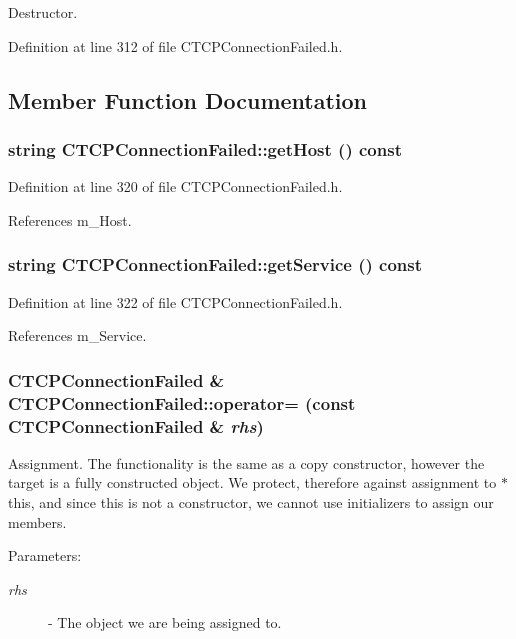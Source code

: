 Destructor.



Definition at line 312 of file CTCPConnection\-Failed.h.

\subsection{Member Function Documentation}
\subsubsection{\setlength{\rightskip}{0pt plus 5cm}string CTCPConnection\-Failed::get\-Host () const\hspace{0.3cm}{\tt  [inline]}}\label{classCTCPConnectionFailed_a5}




Definition at line 320 of file CTCPConnection\-Failed.h.

References m\_\-Host.
\subsubsection{\setlength{\rightskip}{0pt plus 5cm}string CTCPConnection\-Failed::get\-Service () const\hspace{0.3cm}{\tt  [inline]}}\label{classCTCPConnectionFailed_a6}




Definition at line 322 of file CTCPConnection\-Failed.h.

References m\_\-Service.
\subsubsection{\setlength{\rightskip}{0pt plus 5cm}CTCPConnection\-Failed \& CTCPConnection\-Failed::operator= (const CTCPConnection\-Failed \& {\em rhs})}\label{classCTCPConnectionFailed_a3}


Assignment. The functionality is the same as a copy constructor, however the target is a fully constructed object. We protect, therefore against assignment to $\ast$this, and since this is not a constructor, we cannot use initializers to assign our members. \begin{Desc}
\item[Parameters: ]\par
\begin{description}
\item[{\em 
rhs}]- The object we are being assigned to. \end{description}
\end{Desc}


